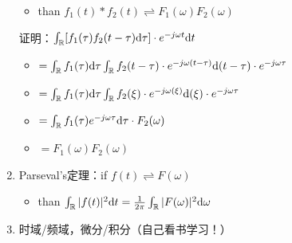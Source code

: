 \documentclass[UTF8]{ctexart}
\begin{document}
\begin{enumerate}[label=(\arabic*),itemindent=0pt,labelindent=\parindent,labelwidth=2em,labelsep=5pt,leftmargin=*]
          \begin{itemize}[label=,left=4.5em]
            \item than $f_1(t)*f_2(t)\rightleftharpoons{F_1(\omega)F_2(\omega)}$
          \end{itemize} \par
          证明：$\int_{\mathbb{R}}[f_1(\tau)f_2(t-\tau){\rm{d}}\tau]\cdot{e^{-j\omega{t}}}{\rm{d}}t$
          \begin{itemize}[label=,left=2.5em]
            \item $=\int_{\mathbb{R}}f_1(\tau){\rm{d}}\tau\int_{\mathbb{R}}f_2(t-\tau)\cdot{e^{-j\omega(t-\tau)}}{\rm{d}}(t-\tau)\cdot{e^{-j\omega{\tau}}}$
            \item $=\int_{\mathbb{R}}f_1(\tau){\rm{d}}\tau\int_{\mathbb{R}}f_2(\xi)\cdot{e^{-j\omega(\xi)}}{\rm{d}}(\xi)\cdot{e^{-j\omega{\tau}}}$
            \item $=\int_{\mathbb{R}}f_1(\tau){e^{-j\omega{\tau}}}{\rm{d}}\tau\cdot{F_2(\omega)}$
            \item $=F_1(\omega)F_2(\omega)$
          \end{itemize} \par
    \item Parseval's定理：if $f(t)\rightleftharpoons{F(\omega)}$ \par
          \begin{itemize}[label=,left=7.1em]
            \item than $\int_{\mathbb{R}}|f(t)|^2{\rm{d}}t=\frac{1}{2\pi}\int_{\mathbb{R}}|F(\omega)|^2{\rm{d}}\omega$
          \end{itemize}
    \item 时域/频域，微分/积分（自己看书学习！）
\end{enumerate}\par
\end{document}
